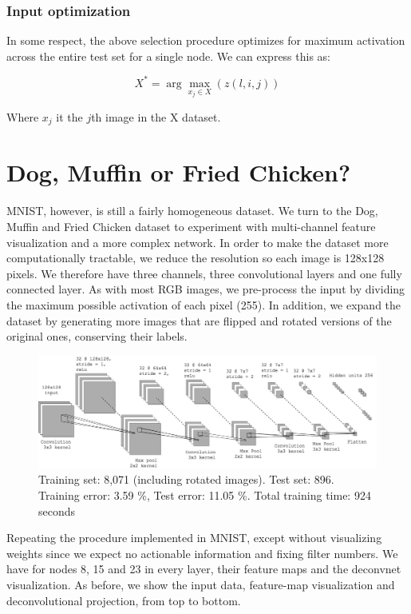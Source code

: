 \documentclass[12pt]{article}
\begin{document}
\subsubsection{Input optimization}

In some respect, the above selection procedure optimizes for maximum activation across the entire test set for a single node. We can express this as:

\[
X^* = \arg \max_{x_j\in X} (z(l, i, j))
\]

Where $x_j$ it the $j$th image in the X dataset.

\section{Dog, Muffin or Fried Chicken?}

MNIST, however, is still a fairly homogeneous dataset. We turn to the Dog, Muffin and Fried Chicken dataset to experiment with multi-channel feature visualization and a more complex network. In order to make the dataset more computationally tractable, we reduce the resolution so each image is 128x128 pixels. We therefore have three channels, three convolutional layers and one fully connected layer. As with most RGB images, we pre-process the input by dividing the maximum possible activation of each pixel (255). In addition, we expand the dataset by generating more images that are flipped and rotated versions of the original ones, conserving their labels. \\

\begin{figure} [H]
\centering
\includegraphics[width=1\linewidth]{../diagrams/DMC_network}
\caption{Training set: 8,071 (including rotated images). Test set: 896. Training error: 3.59 \%, Test error: 11.05 \%. Total training time: 924 seconds}
\label{fig:dmcnetwork}
\end{figure}

Repeating the procedure implemented in MNIST, except without visualizing weights since we expect no actionable information and fixing filter numbers. We have for nodes 8, 15 and 23 in every layer, their feature maps and the deconvnet visualization. As before, we show the input data, feature-map visualization and deconvolutional projection, from top to bottom.
\end{document}
